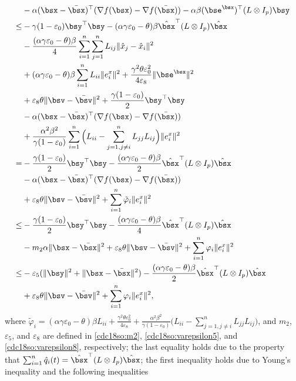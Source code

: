 \documentclass[letterpaper, 10 pt, conference]{ieeeconf}  %
\begin{document}
\begin{align}
&-\alpha (\bsx-\bar{\bsx})^\top(\nabla f(\bsx)-\nabla f(\bar{\bsx}))-\alpha\beta (\bse^\bsx)^\top(L\otimes I_p)\bsy\nonumber\\
\le&-\gamma(1-\varepsilon_0)\bsy^\top \bsy-(\alpha\gamma\varepsilon_0-\theta)\beta\hat{\bsx}^\top (L \otimes I_p)\hat{\bsx}\nonumber\\
&-\frac{(\alpha\gamma\varepsilon_0-\theta)\beta}{4}\sum_{i=1}^n\sum_{j=1}^nL_{ij}
\|\hat{x}_j-\hat{x}_i\|^2\nonumber\\
&+(\alpha\gamma\varepsilon_0-\theta)\beta\sum_{i=1}^{n}L_{ii}\|e^{x}_i\|^2+\frac{\gamma^2\theta
\varepsilon_0^2 }{4\varepsilon_8}\|\bse^{\bsx}\|^2\nonumber\\
&+\varepsilon_8\theta\|\bsv-\bar{\bsv}\|^2+\frac{\gamma(1-\varepsilon_0)}{2}\bsy^\top \bsy
\nonumber\\
&-\alpha (\bsx-\bar{\bsx})^\top(\nabla f(\bsx)-\nabla f(\bar{\bsx}))\nonumber\\
&+\frac{\alpha^2\beta^2}{\gamma(1-\varepsilon_0)}\sum_{i=1}^n\Big(L_{ii}-\sum_{j=1,j\neq i}^nL_{jj}L_{ij}\Big)\|e^{x}_i\|^2\nonumber\\
=&-\frac{\gamma(1-\varepsilon_0)}{2}\bsy^\top \bsy
-\frac{(\alpha\gamma\varepsilon_0-\theta)\beta}{2}\hat{\bsx}^\top (L \otimes I_p)\hat{\bsx}\nonumber\\
&-\alpha (\bsx-\bar{\bsx})^\top(\nabla f(\bsx)-\nabla f(\bar{\bsx}))\nonumber\\
&+\varepsilon_8\theta\|\bsv-\bar{\bsv}\|^2+
\sum_{i=1}^{n}\tilde\varphi_i\|e^{x}_i\|^2\nonumber\\
\le&-\frac{\gamma(1-\varepsilon_0)}{2}\bsy^\top \bsy
-\frac{(\alpha\gamma\varepsilon_0-\theta)\beta}{4}\hat{\bsx}^\top (L \otimes I_p)\hat{\bsx}\nonumber\\
&-m_2\alpha\|\bsx-\bar{\bsx}\|^2+\varepsilon_8\theta\|\bsv-\bar{\bsv}\|^2+
\sum_{i=1}^{n}\varphi_i\|e^{x}_i\|^2\nonumber\\
\le&-\varepsilon_5(\|\bsy\|^2+\|\bsx-\bar{\bsx}\|^2)
-\frac{(\alpha\gamma\varepsilon_0-\theta)\beta}{2}\hat{\bsx}^\top (L \otimes I_p)\hat{\bsx}\nonumber\\
&+\varepsilon_8\theta \|\bsv-\bar{\bsv}\|^2+
\sum_{i=1}^{n}\varphi_i\|e^{x}_i\|^2,
\end{align}
where $\tilde{\varphi}_i=(\alpha\gamma\varepsilon_0-\theta)\beta L_{ii}+\frac{\gamma^2\theta
\varepsilon_0^2 }{4\varepsilon_8}
+\frac{\alpha^2\beta^2}{\gamma(1-\varepsilon_0)}\Big(L_{ii}-\sum_{j=1,j\neq i}^nL_{jj}L_{ij}\Big)$, and $m_2$, $\varepsilon_5$, and $\varepsilon_8$ are defined in \eqref{cdc18so:m2}, \eqref{cdc18so:varepsilon5}, and \eqref{cdc18so:varepsilon8}, respectively; the last equality holds due to the property that $\sum_{i=1}^{n}\hat{q}_i(t)=\hat{\bsx}^\top (L \otimes I_p) \hat{\bsx}$; the first inequality holds due to Young's inequality and the following inequalities
\end{document}
